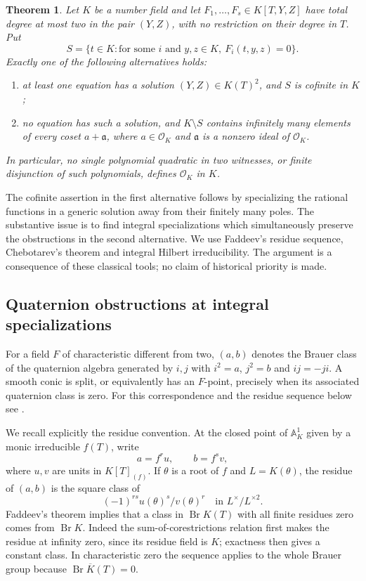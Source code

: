 \documentclass[11pt]{article}
\newtheorem{theorem}{Theorem}[section]
\theoremstyle{definition}
\begin{document}
\begin{theorem}\label{p2lb:quadratic-witnesses}
Let $K$ be a number field and let
$F_1,\ldots,F_s\in K[T,Y,Z]$ have total degree at most two in the
pair $(Y,Z)$, with no restriction on their degree in $T$.  Put
\[
 S=\{t\in K:\text{for some }i\text{ and }y,z\in K,
                         \ F_i(t,y,z)=0\}.
\]
Exactly one of the following alternatives holds:
\begin{enumerate}
\item at least one equation has a solution
$(Y,Z)\in K(T)^2$, and $S$ is cofinite in $K$;
\item no equation has such a solution, and $K\setminus S$ contains
infinitely many elements of every coset $a+\mathfrak a$, where
$a\in\mathcal O_K$ and $\mathfrak a$ is a nonzero ideal of
$\mathcal O_K$.
\end{enumerate}
In particular, no single polynomial quadratic in two witnesses, or
finite disjunction of such polynomials, defines $\mathcal O_K$ in $K$.
\end{theorem}

The cofinite assertion in the first alternative follows by specializing
the rational functions in a generic solution away from their finitely
many poles.  The substantive issue is to find integral specializations
which simultaneously preserve the obstructions in the second alternative.
We use Faddeev's residue sequence, Chebotarev's theorem and integral
Hilbert irreducibility.  The argument is a consequence of these classical
tools; no claim of historical priority is made.

\subsection{Quaternion obstructions at integral specializations}

For a field $F$ of characteristic different from two, $(a,b)$ denotes the
Brauer class of the quaternion algebra generated by $i,j$ with
$i^2=a$, $j^2=b$ and $ij=-ji$.  A smooth conic is split, or equivalently
has an $F$-point, precisely when its associated quaternion class is zero.
For this correspondence and the residue sequence below see
\cite[Theorem~5.1 and Section~6.1]{p2lbBergEtAl2024}.

We recall explicitly the residue convention.  At the closed point of
$\mathbb A^1_K$ given by a monic irreducible $f(T)$, write
\[
 a=f^r u,\qquad b=f^s v,
\]
where $u,v$ are units in $K[T]_{(f)}$.  If $\theta$ is a root of $f$
and $L=K(\theta)$, the residue of $(a,b)$ is the square class of
\[
             (-1)^{rs}u(\theta)^s/v(\theta)^r
             \quad\text{in }L^\times/L^{\times2}.
\]
Faddeev's theorem implies that a class in $\operatorname{Br}K(T)$
with all finite residues zero comes from $\operatorname{Br}K$.
Indeed the sum-of-corestrictions relation first makes the residue at
infinity zero, since its residue field is $K$; exactness then gives a
constant class.  In characteristic zero the sequence applies to the
whole Brauer group because $\operatorname{Br}\overline K(T)=0$.
\end{document}
